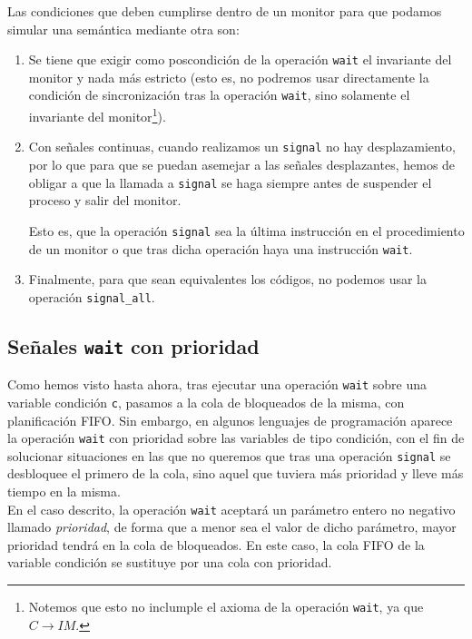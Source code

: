 Las condiciones que deben cumplirse dentro de un monitor para que podamos simular una semántica mediante otra son:
\begin{enumerate}
    \item Se tiene que exigir como poscondición de la operación \verb|wait| el invariante del monitor y nada más estricto (esto es, no podremos usar directamente la condición de sincronización tras la operación \verb|wait|, sino solamente el invariante del monitor\footnote{Notemos que esto no inclumple el axioma de la operación \texttt{wait}, ya que $C\rightarrow IM$.}).
    \item Con señales continuas, cuando realizamos un \verb|signal| no hay desplazamiento, por lo que para que se puedan asemejar a las señales desplazantes, hemos de obligar a que la llamada a \verb|signal| se haga siempre antes de suspender el proceso y salir del monitor.

        Esto es, que la operación \verb|signal| sea la última instrucción en el procedimiento de un monitor o que tras dicha operación haya una instrucción \verb|wait|.
    \item Finalmente, para que sean equivalentes los códigos, no podemos usar la operación \verb|signal_all|.
\end{enumerate}

\subsection{Señales \texttt{wait} con prioridad}
Como hemos visto hasta ahora, tras ejecutar una operación \verb|wait| sobre una variable condición \verb|c|, pasamos a la cola de bloqueados de la misma, con planificación FIFO\@. Sin embargo, en algunos lenguajes de programación aparece la operación \verb|wait| con prioridad sobre las variables de tipo condición, con el fin de solucionar situaciones en las que no queremos que tras una operación \verb|signal| se desbloquee el primero de la cola, sino aquel que tuviera más prioridad y lleve más tiempo en la misma.\\

En el caso descrito, la operación \verb|wait| aceptará un parámetro entero no negativo llamado \textit{prioridad}, de forma que a menor sea el valor de dicho parámetro, mayor prioridad tendrá en la cola de bloqueados. En este caso, la cola FIFO de la variable condición se sustituye por una cola con prioridad.\\

